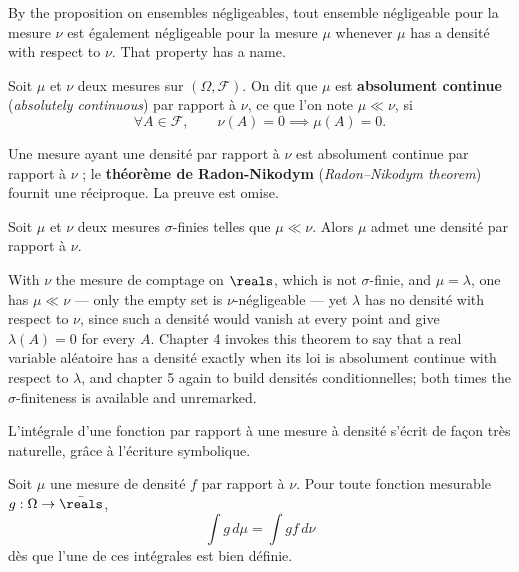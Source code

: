 By the proposition on ensembles négligeables, tout ensemble négligeable pour la
mesure $\nu$ est également négligeable pour la mesure $\mu$ whenever $\mu$ has a
densité with respect to $\nu$. That property has a name.

\begin{definition}
  Soit $\mu$ et $\nu$ deux mesures sur $(\Omega,\mathcal{F})$. On dit que $\mu$ est
  \textbf{absolument continue} (\textit{absolutely continuous}) par rapport à $\nu$,
  ce que l'on note $\mu \ll \nu$, si
  \[
    \forall A \in \mathcal{F}, \qquad \nu(A) = 0 \implies \mu(A) = 0 .
  \]
\end{definition}

Une mesure ayant une densité par rapport à $\nu$ est absolument continue par rapport
à $\nu$ ; le \textbf{théorème de Radon-Nikodym} (\textit{Radon--Nikodym theorem})
fournit une réciproque. La preuve est omise.

\begin{theorem}
  Soit $\mu$ et $\nu$ deux mesures $\sigma$-finies telles que $\mu \ll \nu$. Alors
  $\mu$ admet une densité par rapport à $\nu$.
\end{theorem}

\begin{remark}
  With $\nu$ the mesure de comptage on $\reals$, which is not $\sigma$-finie, and
  $\mu = \lambda$, one has $\mu \ll \nu$ --- only the empty set is
  $\nu$-négligeable --- yet $\lambda$ has no densité with respect to $\nu$, since
  such a densité would vanish at every point and give $\lambda(A) = 0$ for every
  $A$. Chapter 4 invokes this theorem to say that a real variable aléatoire has a
  densité exactly when its loi is absolument continue with respect to $\lambda$, and
  chapter 5 again to build densités conditionnelles; both times the
  $\sigma$-finiteness is available and unremarked.
\end{remark}

L'intégrale d'une fonction par rapport à une mesure à densité s'écrit de façon très
naturelle, grâce à l'écriture symbolique.

\begin{theorem}
  Soit $\mu$ une mesure de densité $f$ par rapport à $\nu$. Pour toute fonction
  mesurable $g : \Omega \to \bar{\reals}$,
  \[
    \int g \, d\mu = \int g f \, d\nu
  \]
  dès que l'une de ces intégrales est bien définie.
\end{theorem}

